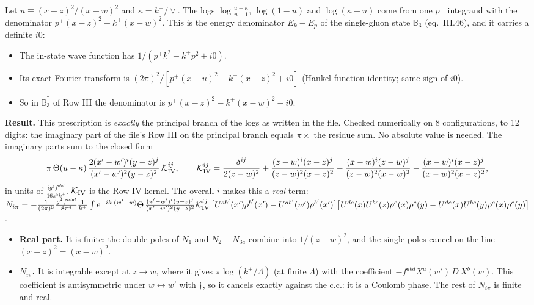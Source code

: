 \documentclass[10pt]{article}
\numberwithin{equation}{section}
\newcommand{\CL}{\big[U^{ab'}(x')\rho^{b'}(x')-U^{ab'}(w')\rho^{b'}(x')\big]}
\newcommand{\CR}{\big[U^{de}(x)U^{bc}(z)\rho^{e}(x)\rho^{c}(y)-U^{de}(x)U^{bc}(y)\rho^{e}(x)\rho^{c}(y)\big]}
\begin{document}
Let $u\equiv(x-z)^2/(x-w)^2$ and $\kappa=k^+/\vee$. The logs $\log\frac{u-\kappa}{u-1}$, $\log(1-u)$ and $\log(\kappa-u)$ come from one $p^+$ integrand with the denominator $p^+(x-z)^2-k^+(x-w)^2$. This is the energy denominator $E_k-E_p$ of the single-gluon state $\mathbb B_3$ (eq.~III.46), and it carries a definite $i0$:
\begin{itemize}
\item The in-state wave function has $1/(p^+k^2-k^+p^2+i0)$.
\item Its exact Fourier transform is $(2\pi)^2/[p^+(x-u)^2-k^+(x-z)^2+i0]$ (Hankel-function identity; same sign of $i0$).
\item So in $\bar{\mathbb B}_3^\dagger$ of Row III the denominator is $p^+(x-z)^2-k^+(x-w)^2-i0$.
\end{itemize}

\textbf{Result.} This prescription is \emph{exactly} the principal branch of the logs as written in the file. Checked numerically on 8 configurations, to 12 digits: the imaginary part of the file's Row III on the principal branch equals $\pi\times$ the residue sum. No absolute value is needed. The imaginary parts sum to the closed form
\[
\pi\,\Theta(u-\kappa)\,\frac{2(x'-w')^i(y-z)^j}{(x'-w')^2(y-z)^2}\,\mathcal K^{ij}_{\rm IV},\qquad
\mathcal K^{ij}_{\rm IV}=\frac{\delta^{ij}}{2(z-w)^2}+\frac{(z-w)^i(x-z)^j}{(z-w)^2(x-z)^2}-\frac{(x-w)^i(z-w)^j}{(z-w)^2(x-w)^2}-\frac{(x-w)^i(x-z)^j}{(x-w)^2(x-z)^2},
\]
in units of $\frac{ig^4f^{abd}}{16\pi^5k^+}$. $\mathcal K_{\rm IV}$ is the Row IV kernel. The overall $i$ makes this a \emph{real} term:
$N_{i\pi}=-\frac{1}{(2\pi)^3}\frac{g^4f^{abd}}{8\pi^4}\frac{1}{k^+}\int e^{-ik\cdot(w'-w)}\Theta\,\frac{(x'-w')^i(y-z)^j}{(x'-w')^2(y-z)^2}\mathcal K^{ij}_{\rm IV}\,\CL\CR$.
\begin{itemize}
\item \textbf{Real part.} It is finite: the double poles of $N_1$ and $N_2+N_{3a}$ combine into $1/(z-w)^2$, and the single poles cancel on the line $(x-z)^2=(x-w)^2$.
\item \textbf{$N_{i\pi}$.} It is integrable except at $z\to w$, where it gives $\pi\log(k^+/\Lambda)$ (at finite $\Lambda$) with the coefficient $-f^{abd}X^a(w')\,D\,X^b(w)$. This coefficient is antisymmetric under $w\leftrightarrow w'$ with $\dagger$, so it cancels exactly against the c.c.: it is a Coulomb phase. The rest of $N_{i\pi}$ is finite and real.
\end{itemize}
\end{document}
